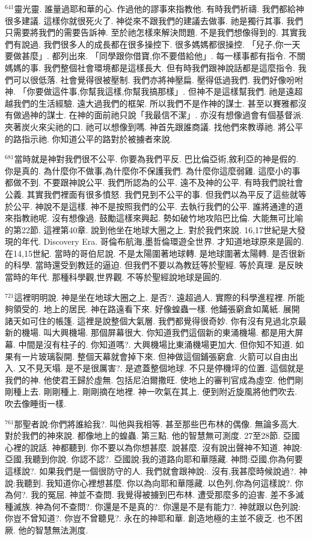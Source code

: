 \documentclass{book}
\begin{document}
$^{641}$靈光靈.
誰量過耶和華的心.
作過他的謬事來指教他.
有時我們祈禱.
我們都給神很多建議.
這樣你就很死火了.
神從來不跟我們的建議去做事.
祂是獨行其事.
我們只需要將我們的需要告訴神.
至於祂怎樣來解決問題.
不是我們想像得到的.
其實我們有說過.
我們很多人的成長都在很多操控下.
很多媽媽都很操控.
「兒子,你一天要做甚麼」.
都列出來.
「同學跟你借寶,你不要借給他」.
每一樣事都有指令.
不關媽媽的事.
我們整個社會環境都是這樣長大.
但有時我們跟神說話都是這麼指令.
我們可以很低落.
社會覺得很被壓制.
我們亦將神壓扁.
壓得低過我們.
我們好像吩咐神.
「你要做這件事,你幫我這樣,你幫我搞那樣」.
但神不是這樣幫我們.
祂是遠超越我們的生活經驗.
遠大過我們的框架.
所以我們不是作神的謀士.
甚至以賽雅都沒有做過神的謀士.
在神的面前祂只說「我最信不潔」.
亦沒有想像過會有個基督派.
夾著炭火來尖祂的口.
祂可以想像到嗎.
神首先跟誰商議.
找他們來教導祂.
將公平的路指示祂.
你知道公平的路對於被擄者來說.

$^{681}$當時就是神對我們很不公平.
你要為我們平反.
巴比倫亞術,敘利亞的神是假的.
你是真的.
為什麼你不做事,為什麼你不保護我們.
為什麼你這麼弱雞.
這麼小的事都做不到.
不要跟神說公平.
我們所認為的公平.
遠不及神的公平.
有時我們說社會公義.
其實我們裡面有很多憤怒.
我們見到不公平的事.
但我們以為平反了這些就等於公平.
神說不是這樣.
神不是按照我們的公平.
去執行我們的公平.
誰將通達的道來指教祂呢.
沒有想像過.
鼓勵這樣來興起.
勢如破竹地攻陷巴比倫.
大能無可比喻的第22節.
這裡第40章.
說到他坐在地球大圈之上.
對於我們來說.
16,17世紀是大發現的年代.
Discovery Era.
哥倫布航海,墨哲倫環遊全世界.
才知道地球原來是圓的.
在14,15世紀.
當時的哥伯尼說.
不是太陽圍著地球轉.
是地球圍著太陽轉.
是否很新的科學.
當時還受到教廷的逼迫.
但我們不要以為教廷等於聖經.
等於真理.
是反映當時的年代.
那種科學觀,世界觀.
不等於聖經說地球是圓的.

$^{721}$這裡明明說.
神是坐在地球大圈之上.
是否?.
遠超過人.
實際的科學進程裡.
所能夠領受的.
地上的居民.
神在路遠看下來.
好像蝗蟲一樣.
他鋪張窮倉如萬紙.
展開諸天如可住的帳篷.
這裡是說整個大氣層.
我們都覺得很奇妙.
你有沒有見過北京最新的機場.
叫大興機場.
那個屏幕很大.
你知道我們這個新的東涌機場.
都是用大屏幕.
中間是沒有柱子的.
你知道嗎?.
大興機場比東涌機場更加大.
但你知不知道.
如果有一片玻璃裂開.
整個天幕就會掉下來.
但神做這個鋪張窮倉.
火箭可以自由出入.
又不見天塌.
是不是很厲害?.
是遮蓋整個地球.
不只是停機坪的位置.
這個就是我們的神.
他使君王歸於虛無.
包括尼泊爾撒旺.
使地上的審判官成為虛空.
他們剛剛種上去.
剛剛種上.
剛剛摘在地裡.
神一吹氣在其上.
便到附近旋風將他們吹去.
吹去像睡街一樣.

$^{761}$那聖者說:你們將誰給我?.
叫他與我相等.
甚至那些巴布林的偶像.
無論多高大.
對於我們的神來說.
都像地上的蝗蟲.
第三點.
他的智慧無可測度.
27至28節.
亞國心裡的說話.
神都聽到.
你不要以為你想甚麼.
說甚麼.
沒有說出聲神不知道.
神說:亞國,我聽到你說.
你認不認?.
亞國說:我的道路向耶和華隱藏.
神問:亞國,你為何要這樣說?.
如果我們是一個很防守的人.
我們就會跟神說:.
沒有,我甚麼時候說過?.
神說:我聽到.
我知道你心裡想甚麼.
你以為向耶和華隱藏.
以色列,你為何這樣說?.
你為何?.
我的冤屈.
神並不查問.
我覺得被擄到巴布林.
遭受那麼多的迫害.
差不多滅種滅族.
神為何不查問?.
你還是不是真的?.
你還是不是有能力?.
神就跟以色列說:你豈不曾知道?.
你豈不曾聽見?.
永在的神耶和華.
創造地極的主並不疲乏.
也不困厥.
他的智慧無法測度.
\end{document}
